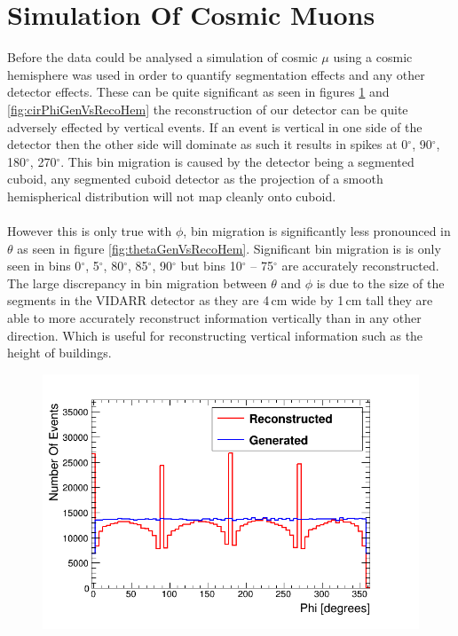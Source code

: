 \section{Simulation Of Cosmic Muons}\label{sec:SimulationOfCosmics}
Before the data could be analysed a simulation of cosmic $\mu$ using a cosmic hemisphere was used in order to quantify segmentation effects and any other detector effects. These can be quite significant as seen in figures \ref{fig:phiGenVsRecoHem} and \ref{fig:cirPhiGenVsRecoHem} the reconstruction of our detector can be quite adversely effected by vertical events. If an event is vertical in one side of the detector then the other side will dominate as such it results in spikes at 0$^\circ$, 90$^\circ$, 180$^\circ$, 270$^\circ$. This bin migration is caused by the detector being a segmented cuboid, any segmented cuboid detector as the projection of a smooth hemispherical distribution will not map cleanly onto cuboid. 
\\\\ However this is only true with $\phi$, bin migration is significantly less pronounced in $\theta$ as seen in figure \ref{fig:thetaGenVsRecoHem}. Significant bin migration is is only seen in bins 0$^\circ$, 5$^\circ$, 80$^\circ$, 85$^\circ$, 90$^\circ$ but bins 10$^\circ$ -- 75$^\circ$ are accurately reconstructed. The large discrepancy in bin migration between $\theta$ and $\phi$ is due to the size of the segments in the VIDARR detector as they are 4\,cm wide by 1\,cm tall they are able to more accurately reconstruct information vertically than in any other direction. Which is useful for reconstructing vertical information such as the height of buildings.
\begin{figure}[htbp]
 \centering
 \includegraphics[width=0.8\linewidth]{Chapter5/Figs/Raster/hemispherePhiCompare.png}
 \label{fig:phiGenVsRecoHem}
\end{figure}

